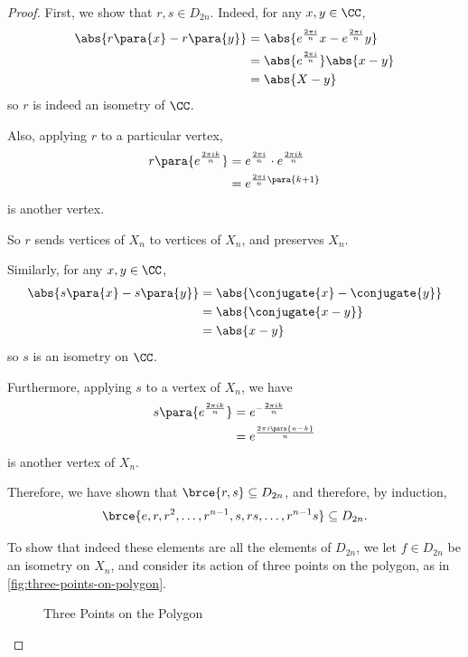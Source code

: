 \begin{proof}
    First, we show that \(r, s \in D_{2n}\). Indeed, for any \(x, y \in \CC\),
    \begin{align*}
        \abs{r\para{x} - r\para{y}} &= \abs{e^{\frac{2 \pi i}{n}} x - e^{\frac{2 \pi i}{n}} y} \\
        &= \abs{e^{\frac{2 \pi i}{n}}} \abs{x - y} \\
        &= \abs{X - y}
    \end{align*}
    so \(r\) is indeed an isometry of \(\CC\).

    Also, applying \(r\) to a particular vertex,
    \begin{align*}
        r\para{e^{\frac{2 \pi i k}{n}}} &= e^{\frac{2 \pi i}{n}} \cdot e^{\frac{2 \pi i k}{n}} \\
        &= e^{\frac{2 \pi i}{n} \para{k + 1}}
    \end{align*}
    is another vertex.

    So \(r\) sends vertices of \(X_n\) to vertices of \(X_n\), and preserves \(X_n\).

    Similarly, for any \(x, y \in \CC\),
    \begin{align*}
        \abs{s \para{x} - s \para{y}} &= \abs{\conjugate{x} - \conjugate{y}} \\
        &= \abs{\conjugate{x - y}} \\
        &= \abs{x - y}
    \end{align*}
    so \(s\) is an isometry on \(\CC\).

    Furthermore, applying \(s\) to a vertex of \(X_n\), we have
    \begin{align*}
        s\para{e^{\frac{2 \pi i k}{n}}} &= e^{- \frac{2 \pi i k}{n}} \\
        &= e^{\frac{2 \pi i \para{n - k}}{n}}
    \end{align*}
    is another vertex of \(X_n\).

    Therefore, we have shown that \(\brce{r, s} \subseteq D_{2n}\), and therefore, by induction,
    \[\brce{e, r, r^2, \ldots, r^{n - 1}, s, rs, \ldots, r^{n - 1} s} \subseteq D_{2n}.\]

    To show that indeed these elements are all the elements of \(D_{2n}\), we let \(f \in D_{2n}\) be an isometry on \(X_n\), and consider its action of three points on the polygon, as in \autoref{fig:three-points-on-polygon}.

    \begin{figure}[ht!]
        \centering
        \caption{Three Points on the Polygon}
        \label{fig:three-points-on-polygon}
    \end{figure}


\end{proof}
